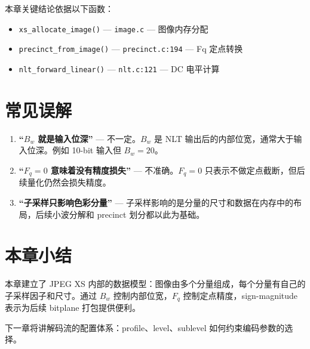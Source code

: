 \begin{codefact}
本章关键结论依据以下函数：
\begin{itemize}
  \item \texttt{xs\_allocate\_image()} --- \texttt{image.c} --- 图像内存分配
  \item \texttt{precinct\_from\_image()} --- \texttt{precinct.c:194} --- Fq 定点转换
  \item \texttt{nlt\_forward\_linear()} --- \texttt{nlt.c:121} --- DC 电平计算
\end{itemize}
\end{codefact}

\section{常见误解}

\begin{misunderstanding}
\begin{enumerate}
  \item \textbf{``$B_w$ 就是输入位深''} --- 不一定。$B_w$ 是 NLT 输出后的内部位宽，通常大于输入位深。例如 10-bit 输入但 $B_w = 20$。
  \item \textbf{``$F_q = 0$ 意味着没有精度损失''} --- 不准确。$F_q = 0$ 只表示不做定点截断，但后续量化仍然会损失精度。
  \item \textbf{``子采样只影响色彩分量''} --- 子采样影响的是分量的尺寸和数据在内存中的布局，后续小波分解和 precinct 划分都以此为基础。
\end{enumerate}
\end{misunderstanding}

\section{本章小结}

本章建立了 JPEG XS 内部的数据模型：图像由多个分量组成，每个分量有自己的子采样因子和尺寸。通过 $B_w$ 控制内部位宽，$F_q$ 控制定点精度，sign-magnitude 表示为后续 bitplane 打包提供便利。

下一章将讲解码流的配置体系：profile、level、sublevel 如何约束编码参数的选择。
